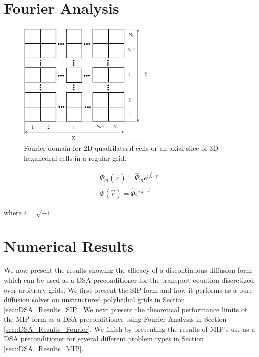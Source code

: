\section{Fourier Analysis}
\label{sec::DSA_Fourier}

\begin{figure}
\centering
\includegraphics[width=0.60\textwidth]{figures/sec_DSA/fourier_sq_layout.png}
\caption{Fourier domain for 2D quadrilateral cells or an axial slice of 3D hexahedral cells in a regular grid.}
\label{fig::}
\end{figure}

\begin{equation}
\label{eq::fourier_sol}
\begin{aligned}
\Psi_m (\vec{r}) = \hat{\Psi}_m e^{i \vec{\lambda} \cdot \vec{r}}\\
\Phi (\vec{r}) = \hat{\Phi} e^{i \vec{\lambda} \cdot \vec{r}}
\end{aligned}
\end{equation}

\noindent where $i=\sqrt{-1}$

\section{Numerical Results}
\label{sec::DSA_Results}

We now present the results showing the efficacy of a discontinuous diffusion form which can be used as a DSA preconditioner for the transport equation discretized over arbitrary grids. We first present the SIP form and how it performs as a pure diffusion solver on unstructured polyhedral grids in Section \ref{sec::DSA_Results_SIP}. We next present the theoretical performance limits of the MIP form as a DSA preconditioner using Fourier Analysis in Section \ref{sec::DSA_Results_Fourier}. We finish by presenting the results of MIP's use as a DSA preconditioner for several different problem types in Section \ref{sec::DSA_Results_MIP}.

